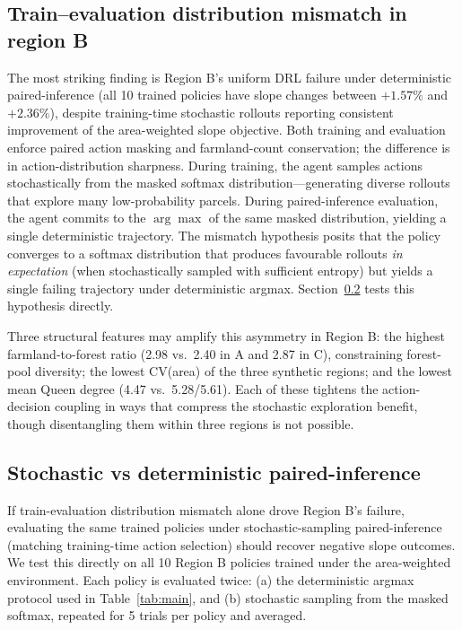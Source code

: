 \documentclass[]{interact}
\theoremstyle{plain}
\begin{document}
\subsection{Train--evaluation distribution mismatch in region B}\label{sec:results-mismatch}

The most striking finding is Region B's uniform DRL failure under deterministic paired-inference (all 10 trained policies have slope changes between $+1.57\%$ and $+2.36\%$), despite training-time stochastic rollouts reporting consistent improvement of the area-weighted slope objective. Both training and evaluation enforce paired action masking and farmland-count conservation; the difference is in action-distribution sharpness. During training, the agent samples actions stochastically from the masked softmax distribution---generating diverse rollouts that explore many low-probability parcels. During paired-inference evaluation, the agent commits to the $\arg\max$ of the same masked distribution, yielding a single deterministic trajectory. The mismatch hypothesis posits that the policy converges to a softmax distribution that produces favourable rollouts \emph{in expectation} (when stochastically sampled with sufficient entropy) but yields a single failing trajectory under deterministic argmax. Section~\ref{sec:results-stochastic} tests this hypothesis directly.

Three structural features may amplify this asymmetry in Region B: the highest farmland-to-forest ratio (2.98 vs.\ 2.40 in A and 2.87 in C), constraining forest-pool diversity; the lowest CV(area) of the three synthetic regions; and the lowest mean Queen degree (4.47 vs.\ 5.28/5.61). Each of these tightens the action-decision coupling in ways that compress the stochastic exploration benefit, though disentangling them within three regions is not possible.

\subsection{Stochastic vs deterministic paired-inference}\label{sec:results-stochastic}

If train-evaluation distribution mismatch alone drove Region B's failure, evaluating the same trained policies under stochastic-sampling paired-inference (matching training-time action selection) should recover negative slope outcomes. We test this directly on all 10 Region B policies trained under the area-weighted environment. Each policy is evaluated twice: (a) the deterministic argmax protocol used in Table~\ref{tab:main}, and (b) stochastic sampling from the masked softmax, repeated for 5 trials per policy and averaged.
\end{document}
